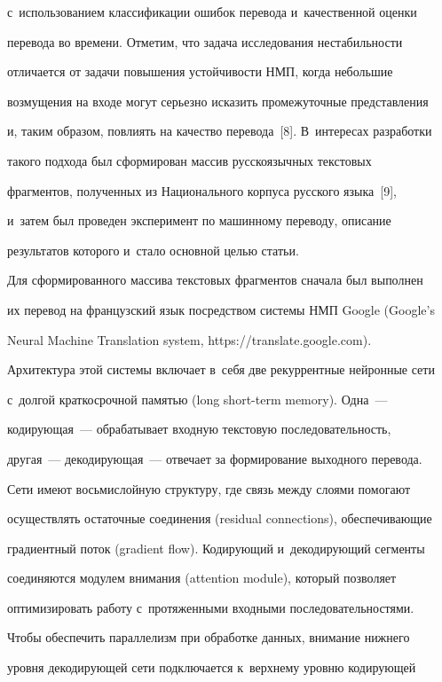 с~использованием классификации ошибок перевода и~качественной оценки 


перевода во времени. Отметим, что задача исследования нестабильности 


отличается от задачи повышения устойчивости НМП, когда небольшие 


возмущения на входе могут серьезно исказить промежуточные представления 


и, таким образом, повлиять на качество перевода~[8]. В~интересах разработки 


такого подхода был сформирован массив русскоязычных текстовых 


фрагментов, полученных из Национального корпуса русского языка~[9], 


и~затем был проведен эксперимент по машинному переводу, описание 


результатов которого и~стало основной целью статьи.


  


  Для сформированного массива текстовых фрагментов сначала был выполнен 


их перевод на французский язык посредством системы НМП Google (Google's 


Neural Machine Translation system, {\sf https://translate.google.com}). 


Архитектура этой системы включает в~себя две рекуррентные нейронные сети 


с~долгой краткосрочной памятью (long short-term memory). Одна~--- 


кодирующая~--- обрабатывает входную текстовую последовательность, 


другая~--- декодирующая~--- отвечает за формирование выходного перевода. 


Сети имеют восьмислойную структуру, где связь между слоями помогают 


осуществлять остаточные соединения (residual connections), обеспечивающие 


градиентный поток (gradient flow). Кодирующий и~декодирующий сегменты 


соединяются модулем внимания (attention module), который позволяет 


оптимизировать работу с~протяженными входными последовательностями. 


Чтобы обеспечить параллелизм при обработке данных, внимание нижнего 


уровня декодирующей сети подключается к~верхнему уровню ко\-ди\-ру\-ющей 


